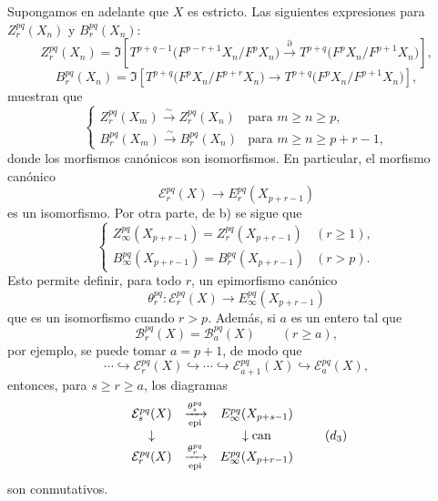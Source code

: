 Supongamos en adelante que \(X\) es estricto. Las siguientes expresiones para \(Z_r^{pq}(X_n)\) y \(B_r^{pq}(X_n)\):
\[
Z_r^{pq}(X_n)=
\Im\!\left[
T^{p+q-1}\bigl(F^{p-r+1}X_n/F^pX_n\bigr)
\xrightarrow{\partial}
T^{p+q}\bigl(F^pX_n/F^{p+1}X_n\bigr)
\right],
\]
\[
B_r^{pq}(X_n)=
\Im\!\left[
T^{p+q}\bigl(F^pX_n/F^{p+r}X_n\bigr)
\longrightarrow
T^{p+q}\bigl(F^pX_n/F^{p+1}X_n\bigr)
\right],
\]
muestran que
\begin{equation}
\left\{
\begin{array}{ll}
Z_r^{pq}(X_m)\xrightarrow{\sim}Z_r^{pq}(X_n)&\text{para }m\ge n\ge p,\\[3pt]
B_r^{pq}(X_m)\xrightarrow{\sim}B_r^{pq}(X_n)&\text{para }m\ge n\ge p+r-1,
\end{array}
\right.
\tag{\(d_1\)}
\end{equation}
donde los morfismos canónicos son isomorfismos. En particular, el morfismo canónico
\[
\mathcal E_r^{pq}(X)\longrightarrow E_r^{pq}(X_{p+r-1})
\]
es un isomorfismo. Por otra parte, de b) se sigue que
\begin{equation}
\left\{
\begin{array}{ll}
Z_\infty^{pq}(X_{p+r-1})=Z_r^{pq}(X_{p+r-1})&(r\ge1),\\[3pt]
B_\infty^{pq}(X_{p+r-1})=B_r^{pq}(X_{p+r-1})&(r>p).
\end{array}
\right.
\tag{\(d_2\)}
\end{equation}
Esto permite definir, para todo \(r\), un epimorfismo canónico
\[
\theta_r^{pq}:\mathcal E_r^{pq}(X)\longrightarrow E_\infty^{pq}(X_{p+r-1})
\]
que es un isomorfismo cuando \(r>p\). Además, si \(a\) es un entero tal que
\[
\mathcal B_r^{pq}(X)=\mathcal B_a^{pq}(X)\qquad(r\ge a),
\]
por ejemplo, se puede tomar \(a=p+1\), de modo que
\begin{equation}
\cdots\hookrightarrow\mathcal E_r^{pq}(X)\hookrightarrow\cdots\hookrightarrow
\mathcal E_{a+1}^{pq}(X)\hookrightarrow\mathcal E_a^{pq}(X),
\tag{S bis}
\end{equation}
entonces, para \(s\ge r\ge a\), los diagramas
\begin{equation}
\begin{array}{ccc}
\mathcal E_s^{pq}(X)&\xrightarrow[\operatorname{epi}]{\theta_s^{pq}}&E_\infty^{pq}(X_{p+s-1})\\
\downarrow&&\downarrow\operatorname{can}\\
\mathcal E_r^{pq}(X)&\xrightarrow[\operatorname{epi}]{\theta_r^{pq}}&E_\infty^{pq}(X_{p+r-1})
\end{array}
\tag{\(d_3\)}
\end{equation}
son conmutativos.
